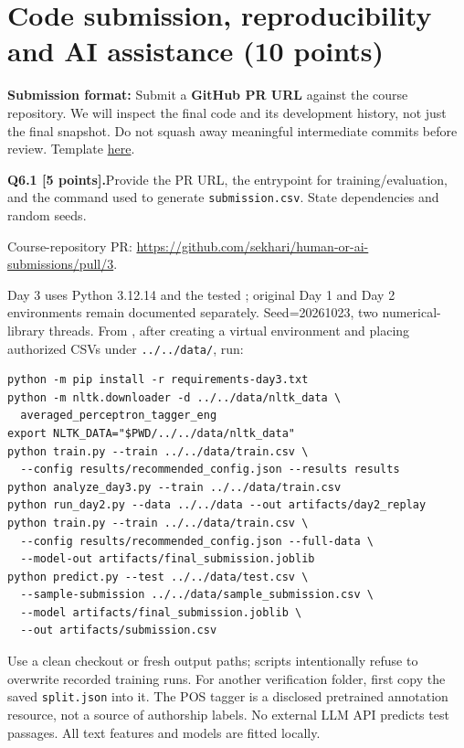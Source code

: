 \documentclass[11pt,letterpaper]{article}
\newcommand{\question}[2]{\needspace{4\baselineskip}\par\addvspace{0.45em}\noindent\textbf{#1}\quad #2\par\nobreak\vspace{0.1em}}
\begin{document}
\section{Code submission, reproducibility and AI assistance (10 points)}
\textbf{Submission format:} Submit a \textbf{GitHub PR URL} against the course repository. We will inspect the final code and its development history, not just the final snapshot. Do not squash away meaningful intermediate commits before review. Template \href{https://github.com/sekhari/human-or-ai-submissions}{here}.

\question{Q6.1 [5 points].}{Provide the PR URL, the entrypoint for training/evaluation, and the command used to generate \texttt{submission.csv}. State dependencies and random seeds.}

Course-repository PR: \url{https://github.com/sekhari/human-or-ai-submissions/pull/3}. \par Day 3 uses Python 3.12.14 and the tested ; original Day 1 and Day 2 environments remain documented separately. Seed=20261023, two numerical-library threads. From , after creating a virtual environment and placing authorized CSVs under \texttt{../../data/}, run:
\begin{small}\begin{verbatim}
python -m pip install -r requirements-day3.txt
python -m nltk.downloader -d ../../data/nltk_data \
  averaged_perceptron_tagger_eng
export NLTK_DATA="$PWD/../../data/nltk_data"
python train.py --train ../../data/train.csv \
  --config results/recommended_config.json --results results
python analyze_day3.py --train ../../data/train.csv
python run_day2.py --data ../../data --out artifacts/day2_replay
python train.py --train ../../data/train.csv \
  --config results/recommended_config.json --full-data \
  --model-out artifacts/final_submission.joblib
python predict.py --test ../../data/test.csv \
  --sample-submission ../../data/sample_submission.csv \
  --model artifacts/final_submission.joblib \
  --out artifacts/submission.csv
\end{verbatim}\end{small}
Use a clean checkout or fresh output paths; scripts intentionally refuse to overwrite recorded training runs. For another verification folder, first copy the saved \texttt{split.json} into it. The POS tagger is a disclosed pretrained annotation resource, not a source of authorship labels. No external LLM API predicts test passages. All text features and models are fitted locally.
\end{document}
